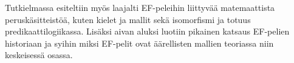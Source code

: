 \documentclass[finnish]{tktltiki2}
\theoremstyle{definition}
\theoremstyle{remark}
\begin{document}
Tutkielmassa esiteltiin myös laajalti EF-peleihin liittyvää matemaattista peruskäsitteistöä, kuten kielet ja mallit sekä isomorfismi ja totuus predikaattilogiikassa. Lisäksi aivan aluksi luotiin pikainen katsaus EF-pelien historiaan ja syihin miksi EF-pelit ovat äärellisten mallien teoriassa niin keskeisessä osassa.




 
\newpage
%
%
%
%







% 
\end{document}
